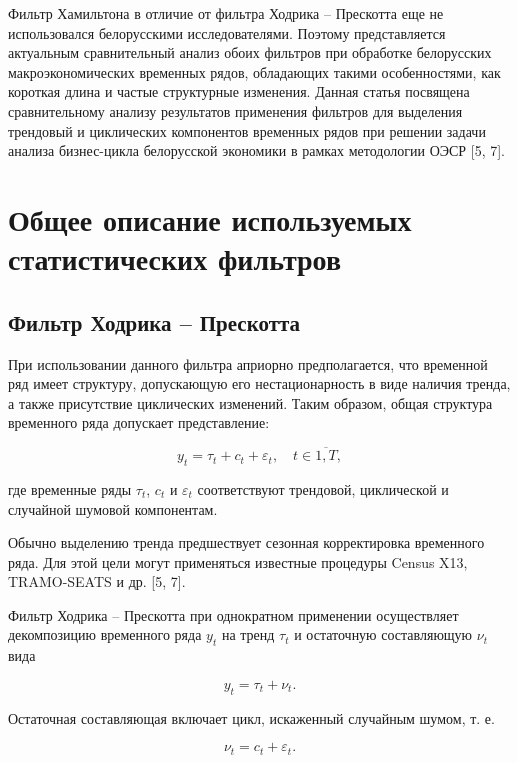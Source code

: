 \documentclass[a4paper,14pt]{extreport}
\begin{document}
	Фильтр Хамильтона в отличие от фильтра Ходрика – Прескотта еще не использовался белорусскими исследователями. Поэтому представляется актуальным сравнительный анализ обоих фильтров при обработке белорусских макроэкономических временных рядов, обладающих такими особенностями, как короткая длина и частые структурные изменения. Данная статья посвящена сравнительному анализу результатов применения фильтров для выделения трендовый и циклических компонентов временных рядов при решении задачи анализа бизнес-цикла белорусской экономики в рамках методологии ОЭСР [5, 7]. 
	
	\section{Общее описание используемых статистических фильтров}
	
	\subsection{Фильтр Ходрика – Прескотта}
	
	При использовании данного фильтра априорно предполагается, что временной ряд   имеет структуру, допускающую его нестационарность в виде наличия тренда, а также присутствие циклических изменений. Таким образом, общая структура временного ряда допускает представление:
	
	\begin{equation}
	\label{eq:decomposition}
	y_t = \tau_t + c_t + \varepsilon_t, \quad t \in \overline{1,T},
	\end{equation}
	
	где временные ряды  $\tau_t$, $c_t$ и $\varepsilon_t$ соответствуют трендовой, циклической и случайной шумовой компонентам. 
	
	Обычно выделению тренда предшествует сезонная корректировка временного ряда. Для этой цели могут применяться известные процедуры Census X13, TRAMO-SEATS и др. [5, 7]. 
	
	Фильтр Ходрика – Прескотта при однократном применении осуществляет декомпозицию временного ряда $y_t$ на тренд $\tau_t$ и остаточную составляющую $\nu_t$ вида
	
	\begin{equation}
	\label{eq:decomp1}
	y_t = \tau_t + \nu_t .
	\end{equation}
	
	Остаточная составляющая включает цикл, искаженный случайным шумом, т. е. 
	
	\begin{equation}
	\label{eq:decomp2}
	\nu_t = c_t + \varepsilon_t .
	\end{equation}
	
\end{document}
